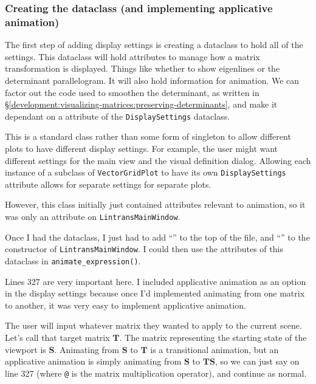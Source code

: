 \documentclass[../development.tex]{subfiles}
\begin{document}
\subsubsection{Creating the dataclass (and implementing applicative animation)\label{development:adding-display-settings:creating-the-dataclass-and-implementing-applicative-animation}}

The first step of adding display settings is creating a dataclass to hold all of the settings. This dataclass will hold attributes to manage how a matrix transformation is displayed. Things like whether to show eigenlines or the determinant parallelogram. It will also hold information for animation. We can factor out the code used to smoothen the determinant, as written in \S\ref{development:visualizing-matrices:preserving-determinants}, and make it dependant on a  attribute of the \texttt{DisplaySettings} dataclass.

This is a standard class rather than some form of singleton to allow different plots to have different display settings. For example, the user might want different settings for the main view and the visual definition dialog. Allowing each instance of a subclass of \texttt{VectorGridPlot} to have its own \texttt{DisplaySettings} attribute allows for separate settings for separate plots.

However, this class initially just contained attributes relevant to animation, so it was only an attribute on \texttt{LintransMainWindow}.


Once I had the dataclass, I just had to add \enquote{} to the top of the file, and \enquote{} to the constructor of \texttt{LintransMainWindow}. I could then use the attributes of this dataclass in \texttt{animate_expression()}.


Lines 327 are very important here. I included applicative animation as an option in the display settings because once I'd implemented animating from one matrix to another, it was very easy to implement applicative animation.

The user will input whatever matrix they wanted to apply to the current scene. Let's call that target matrix $\mathbf{T}$. The matrix representing the starting state of the viewport is $\mathbf{S}$. Animating from $\mathbf{S}$ to $\mathbf{T}$ is a transitional animation, but an applicative animation is simply animating from $\mathbf{S}$ to $\mathbf{T}\mathbf{S}$, so we can just say  on line 327 (where \texttt{@} is the matrix multiplication operator), and continue as normal.
\end{document}
